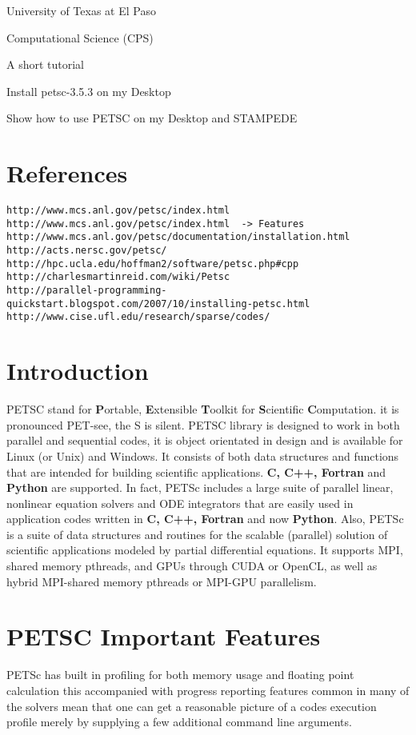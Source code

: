 \documentclass{article}
\begin{document}
\centerline{\sc \large University of Texas at El Paso}
\centerline{\sc \large Computational Science (CPS) }
\vspace{1pc}
\centerline{\sc \large A short tutorial}
\vspace{1pc}
\centerline{\sc \Large Install petsc-3.5.3 on my Desktop}
\centerline{\sc \Large Show how to use PETSC on my Desktop and STAMPEDE}
\section{References}
\begin{verbatim}
http://www.mcs.anl.gov/petsc/index.html
http://www.mcs.anl.gov/petsc/index.html  -> Features
http://www.mcs.anl.gov/petsc/documentation/installation.html
http://acts.nersc.gov/petsc/
http://hpc.ucla.edu/hoffman2/software/petsc.php#cpp
http://charlesmartinreid.com/wiki/Petsc
http://parallel-programming-quickstart.blogspot.com/2007/10/installing-petsc.html
http://www.cise.ufl.edu/research/sparse/codes/
\end{verbatim}

\section{Introduction}	
PETSC stand for \textbf{P}ortable, \textbf{E}xtensible \textbf{T}oolkit for \textbf{S}cientific \textbf{C}omputation. 
it is pronounced PET-see, the S is silent. PETSC library is designed to work in both parallel and sequential codes, it is object orientated in design and is available for Linux (or Unix) and Windows.  It consists of both data structures and functions that are intended for building scientific applications.  \textbf{C, C++, Fortran} and \textbf{Python} are supported. In fact, PETSc includes a large suite of parallel linear, nonlinear equation solvers and ODE integrators that are easily used in application codes written in \textbf{C, C++, Fortran} and now \textbf{Python}. Also, PETSc is a suite of data structures and routines for the scalable (parallel) solution of scientific applications modeled by partial differential equations. It supports MPI, shared memory pthreads, and GPUs through CUDA or OpenCL, as well as hybrid MPI-shared memory pthreads or MPI-GPU parallelism.

\section{PETSC Important Features}
PETSc has built in profiling for both memory usage and floating point calculation this accompanied with progress reporting features common in many of the solvers mean that one can get a reasonable picture of a codes execution profile merely by supplying a few additional command line arguments.
\end{document}
